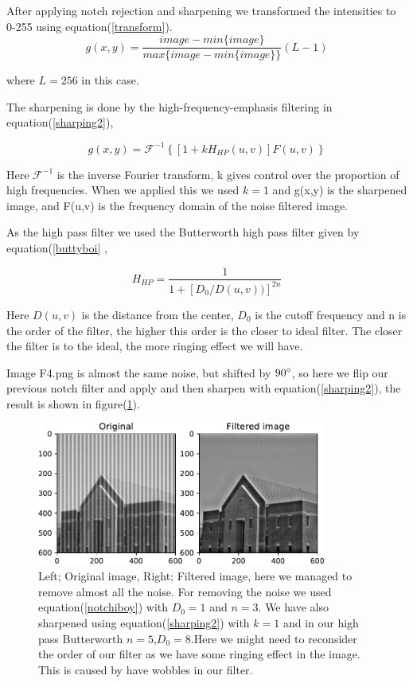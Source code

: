 {    After applying notch rejection and sharpening we transformed the intensities to 0-255 using equation(\ref{transform}).
\begin{equation}
    g(x,y) = \frac{image-min\{image\}}{max\{image-min\{image\}\}}(L-1)
    \label{transform}
\end{equation}

where $L = 256$ in this case.

The sharpening is done by the high-frequency-emphasis filtering in equation(\ref{sharping2}),

\begin{equation}
    g(x,y) = \mathcal{F}^{-1}\left\lbrace[1 + kH_{HP}(u,v)]F(u,v) \right\rbrace
    \label{sharping2}
\end{equation}

Here $\mathcal{F}^{-1}$ is the inverse Fourier transform, k gives control over the proportion of high frequencies. When we applied this we used $k = 1$ and g(x,y) is the sharpened image, and F(u,v) is the frequency domain of the noise filtered image.


As the high pass filter we used the Butterworth high pass filter given by equation(\ref{buttyboi} ,

\begin{equation}
   H_{HP} = \frac{1}{1+[D_{0}/D(u,v))]^{2n}}
    \label{buttyboi}
\end{equation}

Here $D(u,v)$ is the distance from the center, $D_{0}$ is the cutoff frequency and n is the order of the filter, the higher this order is the closer to ideal filter. The closer the filter is to the ideal, the more ringing effect we will have.


Image F4.png is almost the same noise, but shifted by $90\degree$, so here we flip our previous notch filter and apply and then sharpen with equation(\ref{sharping2}), the result is shown in figure(\ref{C7F4}).

\begin{figure}[!htb]
    {\centering
        \includegraphics[width=0.85\textwidth]{C7F4.pdf}
        \caption{Left; Original image, Right; Filtered image, here we managed to remove almost all the noise. For removing the noise we used equation(\ref{notchiboy}) with $D_{0} = 1$ and $n = 3$. We have also sharpened using equation(\ref{sharping2}) with $k = 1$ and in our high pass Butterworth $n = 5$,$D_{0} = 8$.Here we might need to reconsider the order of our filter as we have some ringing effect in the image. This is caused by have wobbles in our filter.}
        \label{C7F4}
    \par}
    \end{figure}

}
